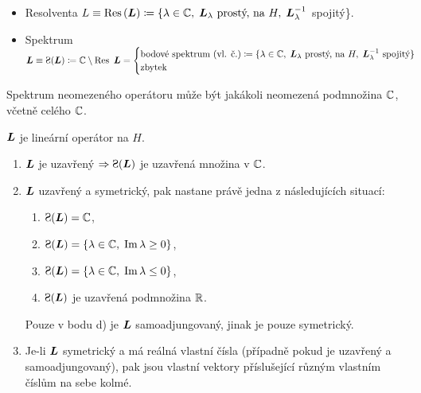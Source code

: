 \begin{definition} \qquad\qquad\qquad\qquad\qquad
\begin{itemize}
    \item Resolventa $L\equiv \operatorname{Res}\,(\boldsymbol{L}) \coloneqq \{ \lambda\in \mathbb{C},\;\boldsymbol{L}_{\lambda} \text{ prostý, na }H,\;\boldsymbol{L}_\lambda^{-1}$ spojitý\}.
    \item Spektrum $\map L\equiv \Sp(\map L) \coloneqq \C \setminus \Res\, \map L = \begin{cases}
\text{bodové spektrum (vl. č.)} \coloneqq \{\lambda\in\C,\;\map L_\lambda \text{ prostý, na } H,\; \map L_\lambda^{-1} \text{ spojitý}\}\\
\text{zbytek}
\end{cases}$
\end{itemize}
\end{definition}

\begin{remark}
Spektrum neomezeného operátoru může být jakákoli neomezená podmnožina $\mathbb{C}$, včetně celého $\mathbb{C}$.
\end{remark}

$\boldsymbol{L}$ je lineární operátor na $H$. \begin{enumerate}
    \item $\boldsymbol{L}$ je uzavřený $\Rightarrow \Sp(\map L)$ je uzavřená množina v $\mathbb{C}$.
    \item $\boldsymbol{L}$ uzavřený a symetrický, pak nastane právě jedna z následujících situací: \begin{enumerate}
        \item $\Sp(\map L) = \C$,
        \item $\Sp(\map L) = \{ \lambda \in \C,\; \mathrm{Im}\, \lambda \geq 0 \}$,
         \item $\Sp(\map L) = \{ \lambda \in \C,\; \mathrm{Im} \, \lambda \leq 0 \}$,
          \item $\Sp(\map L)$ je uzavřená podmnožina $\mathbb{R}$.
    \end{enumerate}
    Pouze v bodu d) je $\boldsymbol{L}$ samoadjungovaný, jinak je pouze symetrický.
    \item Je-li $\boldsymbol{L}$ symetrický a má reálná vlastní čísla (případně pokud je uzavřený a samoadjungovaný), pak jsou vlastní vektory příslušející různým vlastním číslům na sebe kolmé.
\end{enumerate}


